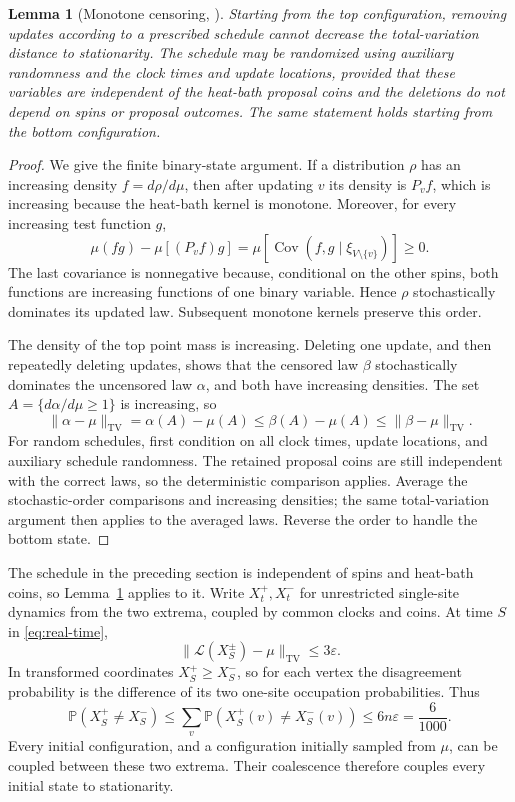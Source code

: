 \documentclass[11pt]{article}
\newtheorem{lemma}[theorem]{Lemma}
\newcommand{\Prb}{\mathbb P}
\newcommand{\TV}{\operatorname{TV}}
\newcommand{\Law}{\mathcal L}
\begin{document}
\begin{lemma}[Monotone censoring, \cite{PW}]\label{lem:censor}
Starting from the top configuration, removing updates according to a prescribed schedule cannot decrease the total-variation distance to stationarity. The schedule may be randomized using auxiliary randomness and the clock times and update locations, provided that these variables are independent of the heat-bath proposal coins and the deletions do not depend on spins or proposal outcomes. The same statement holds starting from the bottom configuration.
\end{lemma}

\begin{proof}
We give the finite binary-state argument. If a distribution $\rho$ has an increasing density $f=d\rho/d\mu$, then after updating $v$ its density is $P_vf$, which is increasing because the heat-bath kernel is monotone. Moreover, for every increasing test function $g$,
\[
\mu(fg)-\mu[(P_vf)g]
=\mu[\operatorname{Cov}(f,g\mid\xi_{V\setminus\{v\}})]\ge0.
\]
The last covariance is nonnegative because, conditional on the other spins, both functions are increasing functions of one binary variable. Hence $\rho$ stochastically dominates its updated law. Subsequent monotone kernels preserve this order.

The density of the top point mass is increasing. Deleting one update, and then repeatedly deleting updates, shows that the censored law $\beta$ stochastically dominates the uncensored law $\alpha$, and both have increasing densities. The set $A=\{d\alpha/d\mu\ge1\}$ is increasing, so
\[
\|\alpha-\mu\|_{\TV}=\alpha(A)-\mu(A)
\le\beta(A)-\mu(A)\le\|\beta-\mu\|_{\TV}.
\]
For random schedules, first condition on all clock times, update locations, and auxiliary schedule randomness. The retained proposal coins are still independent with the correct laws, so the deterministic comparison applies. Average the stochastic-order comparisons and increasing densities; the same total-variation argument then applies to the averaged laws. Reverse the order to handle the bottom state.
\end{proof}

The schedule in the preceding section is independent of spins and heat-bath coins, so Lemma~\ref{lem:censor} applies to it. Write $X_t^+,X_t^-$ for unrestricted single-site dynamics from the two extrema, coupled by common clocks and coins. At time $S$ in \eqref{eq:real-time},
\[
\|\Law(X_S^\pm)-\mu\|_{\TV}\le3\varepsilon.
\]
In transformed coordinates $X_S^+\ge X_S^-$, so for each vertex the disagreement probability is the difference of its two one-site occupation probabilities. Thus
\[
\Prb(X_S^+\ne X_S^-)
\le\sum_v\Prb(X_S^+(v)\ne X_S^-(v))
\le6n\varepsilon=\frac6{1000}.
\]
Every initial configuration, and a configuration initially sampled from $\mu$, can be coupled between these two extrema. Their coalescence therefore couples every initial state to stationarity.
\end{document}
